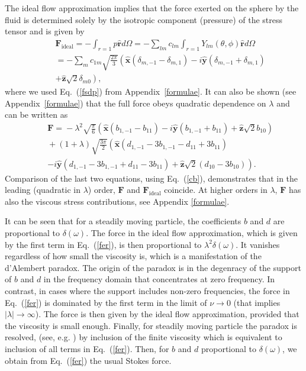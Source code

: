 \documentclass[aps,prx,twocolumn,amsmath,amssymb,amsfonts]{revtex4-2}
\begin{document}
{{The ideal flow approximation implies that the force exerted on the sphere by the fluid is determined solely by the isotropic component (pressure) of the stress tensor and is given by
\begin{eqnarray}&&\!\!\!\!\!\!
\bm F_\mathrm{ideal}=-\int_{r=1} p\bm{\hat r} d\Omega=- \sum_{lm}c_{lm}\int_{r=1} Y_{lm}(\theta, \phi) \bm{\hat r} d\Omega
\nonumber\\&&\!\!\!\!\!\!
=- \sum_{m}c_{1m}\sqrt{\frac{2\pi}{3}}  \left(\bm{\hat x}(\delta_{m, -1}-\delta_{m, 1})\!-\! i\bm{\hat y}(\delta_{m, -1}+\delta_{m, 1})
\right.\nonumber\\&&\!\!\!\!\!\!\left.
+\bm{\hat z}\sqrt{2}\delta_{m0}\right),
\end{eqnarray}
where we used Eq.~(\ref{fsdp}) from Appendix~\ref{formulae}. It can also be shown (see Appendix~\ref{formulae}) that the full force obeys quadratic dependence on $\lambda$ and can be written as
\begin{eqnarray}&&\!\!\!\!
\bm F\!=\!-\lambda^2\sqrt{\frac{\pi}{6}} \left(\bm{\hat x}(b_{1, -1}\!-\!b_{11})\!-\! i\bm{\hat y}(b_{1, -1}\!+\!b_{11})\!+\!\bm{\hat z}\sqrt{2}b_{10}\right)
\nonumber\\&&\!\!\!\!
+(1\!+\!\lambda)\sqrt{\frac{3\pi}{2}} \left(\bm{\hat x}(d_{1, -1}\!-\!3b_{1, -1}\!-\!d_{11}\!+\!3b_{11})
 \right.\nonumber\\&&\!\!\!\!\left.
- i\bm{\hat y}(d_{1, -1}\!-\!3b_{1, -1}\!+\!d_{11}\!-\!3b_{11})\!+\!\bm{\hat z}\sqrt{2}\left(d_{10}\!-\!3b_{10}\right)\right).\label{fer}
\end{eqnarray}
Comparison of the last two equations, using Eq.~(\ref{cb}), demonstrates that in the leading (quadratic in $\lambda$) order, $\bm F$ and $\bm F_\mathrm{ideal}$ coincide. At higher orders in $\lambda$, $\bm F$ has also the viscous stress contributions, see Appendix \ref{formulae}.

It can be seen that for a steadily moving particle, the coefficients $b$ and $d$ are proportional to $\delta(\omega)$. The force in the ideal flow approximation, which is given by the first term in Eq.~(\ref{fer}), is then proportional to $\lambda^2\delta(\omega)$. It vanishes regardless of how small the viscosity is, which is a manifestation of the d'Alembert paradox. The origin of the paradox is in the degenracy of the support of $b$ and $d$ in the frequency domain that concentrates at zero frequency. In contrast, in cases where the support includes non-zero frequencies, the force in Eq.~(\ref{fer}) is dominated by the first term in the limit of $\nu \to 0$ (that implies $|\lambda|\to \infty$). The force is then given by the ideal flow approximation, provided that the viscosity is small enough. Finally, for steadily moving particle the paradox is resolved, (see, e.g. \cite{LL}) by inclusion of the finite viscosity which is equivalent to inclusion of all terms in Eq.~(\ref{fer}). Then, for $b$ and $d$ proportional to $\delta(\omega)$, we obtain from Eq.~(\ref{fer}) the usual Stokes force.

}}
\end{document}
